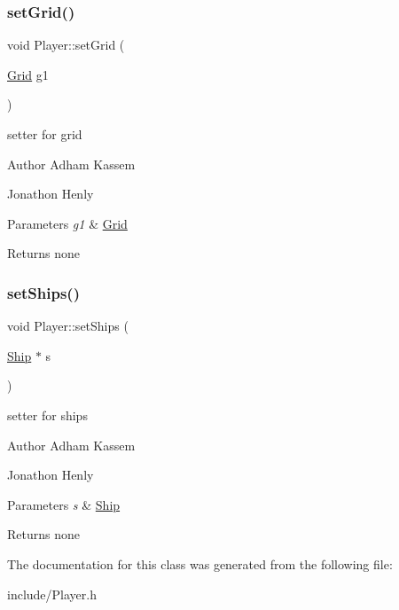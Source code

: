 \subsubsection{\texorpdfstring{set\+Grid()}{setGrid()}}
{\footnotesize\ttfamily void Player\+::set\+Grid (\begin{DoxyParamCaption}\item[{\hyperlink{classGrid}{Grid}}]{g1 }\end{DoxyParamCaption})\hspace{0.3cm}{\ttfamily [inline]}}

setter for grid \begin{DoxyAuthor}{Author}
Adham Kassem 

Jonathon Henly 
\end{DoxyAuthor}

\begin{DoxyParams}{Parameters}
{\em g1} & \hyperlink{classGrid}{Grid} \\
\hline
\end{DoxyParams}
\begin{DoxyReturn}{Returns}
none 
\end{DoxyReturn}
\mbox{\label{classPlayer_ab567a03f1c8fd3f61afc1dd9a54a1744}} 
\subsubsection{\texorpdfstring{set\+Ships()}{setShips()}}
{\footnotesize\ttfamily void Player\+::set\+Ships (\begin{DoxyParamCaption}\item[{\hyperlink{classShip}{Ship} $\ast$}]{s }\end{DoxyParamCaption})\hspace{0.3cm}{\ttfamily [inline]}}

setter for ships \begin{DoxyAuthor}{Author}
Adham Kassem 

Jonathon Henly 
\end{DoxyAuthor}

\begin{DoxyParams}{Parameters}
{\em s} & \hyperlink{classShip}{Ship} \\
\hline
\end{DoxyParams}
\begin{DoxyReturn}{Returns}
none 
\end{DoxyReturn}


The documentation for this class was generated from the following file\+:\begin{DoxyCompactItemize}
\item 
include/Player.\+h\end{DoxyCompactItemize}
